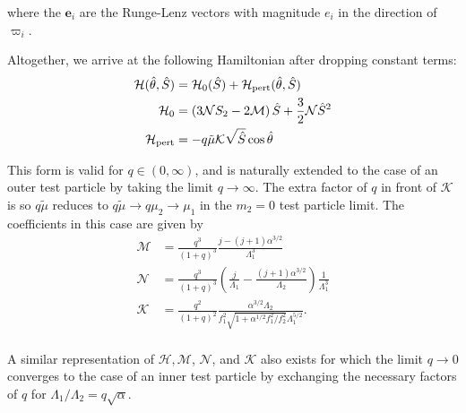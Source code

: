 \documentclass[usenatbib,twocolumn]{mnras}
\begin{document}
\noindent
where the \(\mathbf{e}_i\) are the Runge-Lenz vectors with magnitude
\(e_i\) in the direction of \(\varpi_i\).  

Altogether, we arrive at the following Hamiltonian after
dropping constant terms:
\begin{align}
  \label{eq:HShat}\mathcal H(\hat \theta, \hat S) &= \mathcal H_0(\hat S) + \mathcal H_{\rm pert}(\hat \theta, \hat S) \\
  \mathcal H_0
  &= \left( 3\mathcal NS_2 -2\mathcal M\right) \hat S
    + \frac32 \mathcal N \hat S^2 \\
  \mathcal H_{\rm pert}
  &= - q\tilde\mu\mathcal K\sqrt{\hat S}\cos\hat\theta
\end{align}

\noindent This form is valid for \(q\in (0,\infty)\), and is
naturally extended to the case of an outer test particle by taking the
limit \(q\to\infty\).  The extra factor of \(q\) in front of \(\mathcal K\)
is so \(q\tilde\mu\) reduces to \(q\tilde\mu\to q\mu_2 \to \mu_1\) in the
\(m_2=0\) test particle limit.  The coefficients in this case are given
by
\begin{align}
  \mathcal M
  &= \frac{q^3}{(1+q)^3}\frac{j-(j+1)\alpha^{3/2}}{\Lambda_1^3}\\
  \mathcal N
  &= \frac{q^3}{(1+q)^3}\left(
    \frac{j}{\Lambda_1} - \frac{(j+1)\alpha^{3/2}}{\Lambda_2}
    \right)\frac{1}{\Lambda_1^3}\\
  \mathcal K
  &= \frac{q^2}{(1+q)^2}
    \frac{\alpha^{3/2}\Lambda_2}{f_1^2\sqrt{1+\alpha^{1/2}f_1^2/f_2^2}\Lambda_1^{5/2}}.\\
\end{align}

A similar representation of \(\mathcal H, \mathcal M\), \(\mathcal N\),
and \(\mathcal{K}\) also exists for which the limit \(q\to 0\) converges
to the case of an inner test particle by exchanging the necessary
factors of \(q\) for \(\Lambda_1/\Lambda_2 = q\sqrt\alpha\).
\end{document}
